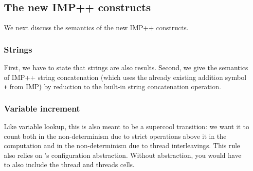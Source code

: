 \documentclass{article}
\begin{document}
\begin{kdefinition}
\begin{module}{}
\begin{kblock}[text]
 \subsection{The new IMP++ constructs}
We next discuss the semantics of the new IMP++ constructs. \end{kblock}
\begin{kblock}[text]
 \subsubsection{Strings}
First, we have to state that strings are also results.
Second, we give the semantics of IMP++ string concatenation (which
uses the already existing addition symbol \texttt{+} from IMP) by
reduction to the built-in string concatenation operation. \end{kblock}

\begin{syntaxBlock}{}
\end{syntaxBlock}
\begin{kblock}[text]
 \subsubsection{Variable increment}
Like variable lookup, this is also meant to be a supercool transition: we
want it to count both in the non-determinism due to strict operations above
it in the computation and in the non-determinism due to thread
interleavings.  This rule also relies on \K's configuration abstraction.
Without abstraction, you would have to also include the \textsf{thread} and
\textsf{threads} cells. \end{kblock}
\begin{kblock}[text]

\end{kblock}
\end{module}
\end{kdefinition}
\end{document}

